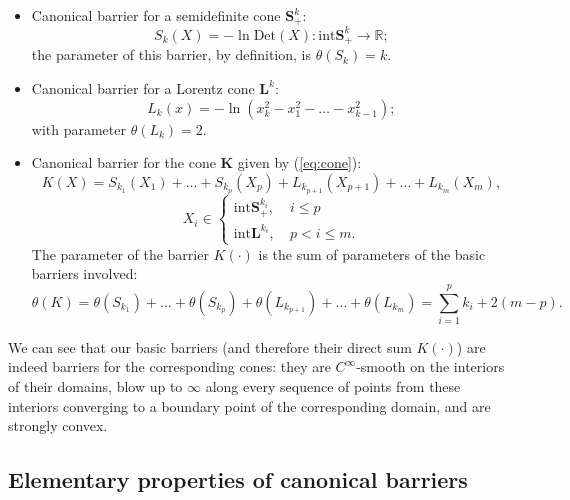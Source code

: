 \documentclass[11pt,a4paper]{article}
\newcommand{\R}{\mathbb{R}}
\begin{document}
\begin{itemize}
    \item Canonical barrier for a semidefinite cone $\textbf{S}_+^k$: 
    \begin{equation*}
        S_k(X) = -\ln \text{Det}(X) : \text{int} \textbf{S}_+^k \to \R;
    \end{equation*}
the parameter of this barrier, by definition, is $\theta(S_k)=k$.
    \item Canonical barrier for a Lorentz cone $\textbf{L}^k$:
    \begin{equation*}
        L_k(x) = -\ln(x_k^2-x_1^2-\dots -x_{k-1}^2);
    \end{equation*}
    with parameter $\theta(L_k) = 2$.
    \item Canonical barrier for the cone $\textbf{K}$ given by (\ref{eq:cone}):
    \begin{equation*}
        K(X) = S_{k_1}(X_1)+\dots+S_{k_p}(X_p)+L_{k_{p+1}}(X_{p+1})+\dots+L_{k_{m}}(X_{m}),
    \end{equation*}
    \begin{equation*}
        X_i \in 
        \begin{cases}
          \text{int}\textbf{S}_+^{k_i}, & \ i\leq p \\
          \text{int}\textbf{L}^{k_i}, & \ p<i\leq m.
        \end{cases}
    \end{equation*}
    The parameter of the barrier $K(\cdot)$ is the sum of parameters of the basic barriers involved:
    \begin{equation*}
        \theta(K) = \theta(S_{k_1})+\dots+\theta(S_{k_p})+\theta(L_{k_{p+1}})+\dots+\theta(L_{k_{m}}) = \overset{p}{\underset{i=1}{\sum}} k_i + 2(m-p).
    \end{equation*}
\end{itemize}

We can see that our basic barriers (and therefore their direct sum $K(\cdot)$) are indeed barriers for the corresponding cones: they are $C^\infty$-smooth on the interiors of their domains, blow up to $\infty$ along every sequence of points from these interiors converging to a boundary point of the corresponding domain, and are strongly convex.

\subsection{Elementary properties of canonical barriers}
\end{document}
